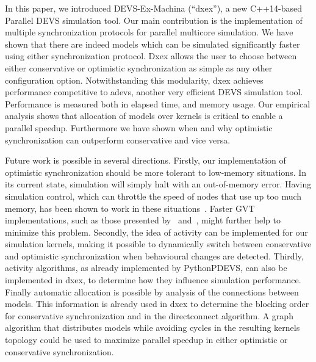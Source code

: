In this paper, we introduced DEVS-Ex-Machina (``dxex''), a new C++14-based \textsf{Parallel DEVS} simulation tool.
Our main contribution is the implementation of multiple synchronization protocols for parallel multicore simulation.
We have shown that there are indeed models which can be simulated significantly faster using either synchronization protocol.
Dxex allows the user to choose between either conservative or optimistic synchronization as simple as any other configuration option.
Notwithstanding this modularity, dxex achieves performance competitive to adevs, another very efficient \textsf{DEVS} simulation tool.
Performance is measured both in elapsed time, and memory usage.
Our empirical analysis shows that allocation of models over kernels is critical to enable a parallel speedup. Furthermore we have shown when and why optimistic synchronization can outperform conservative and vice versa.

Future work is possible in several directions.
Firstly, our implementation of optimistic synchronization should be more tolerant to low-memory situations.
In its current state, simulation will simply halt with an out-of-memory error.
Having simulation control, which can throttle the speed of nodes that use up too much memory, has been shown to work in these situations~\cite{FujimotoBook}.
Faster GVT implementations, such as those presented by~\cite{Fujimoto:1997:CGV:268403.268404} and~\cite{Bauer:2005:SND:1069810.1070159}, might further help to minimize this problem.
Secondly, the idea of activity can be implemented for our simulation kernels, making it possible to dynamically switch between conservative and optimistic synchronization when behavioural changes are detected.
Thirdly, activity algorithms, as already implemented by PythonPDEVS, can also be implemented in dxex, to determine how they influence simulation performance.
Finally automatic allocation is possible by analysis of the connections between models. This information is already used in dxex to determine the blocking order for conservative synchronization and in the directconnect algorithm. A graph algorithm that distributes models while avoiding cycles in the resulting kernels topology could be used to maximize parallel speedup in either optimistic or conservative synchronization.